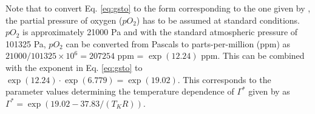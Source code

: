 \documentclass[gmd, manuscript]{copernicus}
\begin{document}
Note that to convert Eq. \ref{eq:gsto} to the form corresponding to the one given by \citet{bernacchi01}, the partial pressure of oxygen ($pO_2$) has to be assumed at standard conditions. $pO_2$ is approximately 21000 Pa and with the standard atmospheric pressure of 101325 Pa, $pO_2$ can be converted from Pascals to parts-per-million (ppm) as $21000/101325 \times 10^6 = 207254$ ppm = $\exp(12.24)$ ppm. This can be combined with the exponent in Eq. \ref{eq:gsto} to $\exp(12.24) \cdot \exp(6.779) = \exp(19.02)$. This corresponds to the parameter values determining the temperature dependence of $\Gamma^\ast$ given by \citet{bernacchi01} as  $\Gamma^\ast = \exp(19.02-37.83/(T_K R))$.



\end{document}
